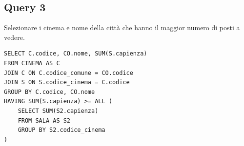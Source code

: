 \subsection{Query 3}
Selezionare i cinema e nome della città che hanno il maggior numero di posti a vedere.
\begin{lstlisting}
SELECT C.codice, CO.nome, SUM(S.capienza)
FROM CINEMA AS C
JOIN C ON C.codice_comune = CO.codice
JOIN S ON S.codice_cinema = C.codice
GROUP BY C.codice, CO.nome
HAVING SUM(S.capienza) >= ALL (
    SELECT SUM(S2.capienza)
    FROM SALA AS S2
    GROUP BY S2.codice_cinema
)
\end{lstlisting}
